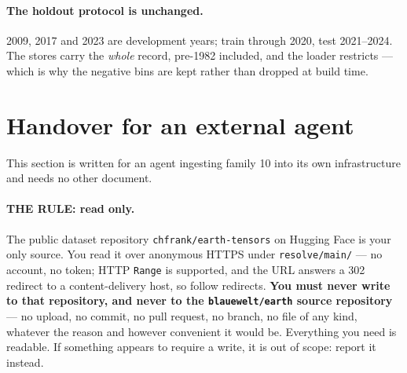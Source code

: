 \documentclass[10pt]{article}
\newcommand{\code}[1]{\texttt{#1}}
\begin{document}
\paragraph{The holdout protocol is unchanged.} 2009, 2017 and 2023 are
development years; train through 2020, test 2021--2024. The stores carry the
\emph{whole} record, pre-1982 included, and the loader restricts --- which is why
the negative bins are kept rather than dropped at build time.

\section{Handover for an external agent}

This section is written for an agent ingesting family 10 into its own
infrastructure and needs no other document.

\paragraph{THE RULE: read only.} The public dataset repository
\code{chfrank/earth-tensors} on Hugging Face is your only source. You read it
over anonymous HTTPS under \code{resolve/main/} --- no account, no token; HTTP
\code{Range} is supported, and the URL answers a 302 redirect to a
content-delivery host, so follow redirects. \textbf{You must never write to that
repository, and never to the \code{blauewelt/earth} source repository} --- no
upload, no commit, no pull request, no branch, no file of any kind, whatever the
reason and however convenient it would be. Everything you need is readable. If
something appears to require a write, it is out of scope: report it instead.
\end{document}
